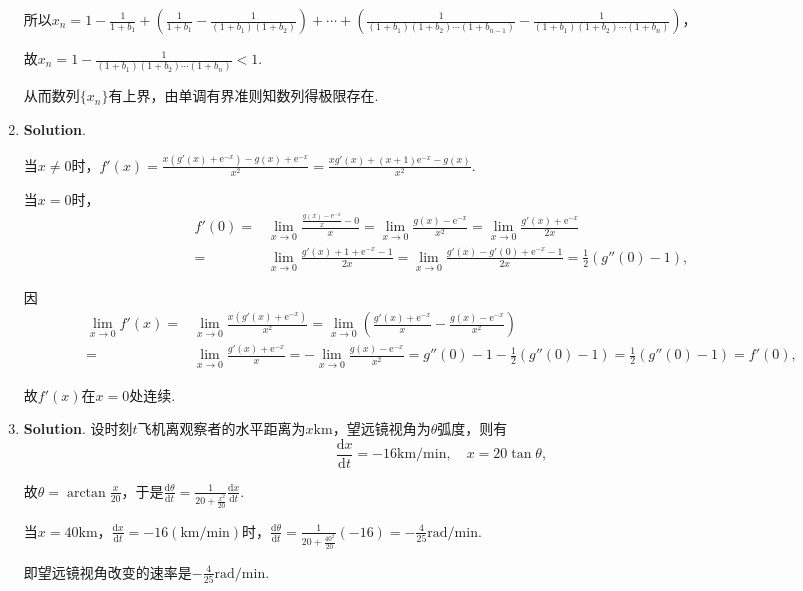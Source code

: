 \documentclass[../Main.tex]{subfiles}
\begin{document}
\begin{enumerate}
          所以$x_{n}=1-\frac{1}{1+b_{1}}+\left(\frac{1}{1+b_{1}}-\frac{1}{(1+b_{1})(1+b_{2})}
              \right)+\cdots+\left(\frac{1}{(1+b_{1})(1+b_{2})\cdots(1+b_{n-1})}-\frac{1}{(1+b_{1})(1+b_{2})\cdots(1+b_{n})}
              \right)$，

          故$x_{n}=1-\frac{1}{(1+b_{1})(1+b_{2})\cdots(1+b_{n})}<1$.

          从而数列$\{x_{n}\}$有上界，由单调有界准则知数列得极限存在.

    \item \textbf{Solution}.

          当$x\neq0$时，$f'(x)=\frac{x(g'(x)+\mathrm{e}^{-x})-g(x)+\mathrm{e}^{-x}}{x^{2}}
              =\frac{xg'(x)+(x+1)\mathrm{e}^{-x}-g(x)}{x^{2}}$.

          当$x=0$时，
          \[
              \begin{aligned}
                  f'(0)= & \lim_{x\to0}\frac{\frac{g(x)-\mathrm{e}^{-x}}{x}-0}{x}=\lim_{x\to0}\frac{g(x)-\mathrm{e}^{-x}}{x^2}=\lim_{x\to0}\frac{g'(x)+\mathrm{e}^{-x}}{2x} \\
                  =      & \lim_{x\to0}\frac{g'(x)+1+\mathrm{e}^{-x}-1}{2x}=\lim_{x\to0}\frac{g'(x)-g'(0)+\mathrm{e}^{-x}-1}{2x}=\frac{1}{2}(g''(0)-1),
              \end{aligned}
          \]

          因
          \[
              \begin{aligned}
                  \lim_{x\to 0}f'(x)= & \lim_{x\to0}\frac{x(g'(x)+\mathrm{e}^{-x})}{x^2}=\lim_{x\to0}\left(\frac{g'(x)+\mathrm{e}^{-x}}{x}-\frac{g(x)-\mathrm{e}^{-x}}{x^2}\right)            \\
                  =                   & \lim_{x\to0}\frac{g'(x)+\mathrm{e}^{-x}}{x}=-\lim_{x\to0}\frac{g(x)-\mathrm{e}^{-x}}{x^2}=g''(0)-1-\frac{1}{2}(g''(0)-1)=\frac{1}{2}(g''(0)-1)=f'(0),
              \end{aligned}
          \]

          故$f'(x)$在$x=0$处连续.

    \item \textbf{Solution}. 设时刻$t$飞机离观察者的水平距离为$x\mathrm{km}$，望远镜视角为$\theta$弧度，则有
          \[
              \frac{\mathrm{d}x}{\mathrm{d}t}=-16\mathrm{km/min},\quad x=20\tan\theta,
          \]

          故$\theta=\arctan\frac{x}{20}$，于是$\frac{\mathrm{d}\theta}{\mathrm{d}t}=\frac{1}{20+\frac{x^2}{20}}
              \frac{\mathrm{d}x}{\mathrm{d}t}$.

          当$x=40\mathrm{km}$，$\frac{\mathrm{d}x}{\mathrm{d}t}=-16(\mathrm{km/min})$时，$\frac{\mathrm{d}\theta}{\mathrm{d}t}
              =\frac{1}{20+\frac{40^2}{20}}(-16)=-\frac{4}{25}\mathrm{rad/min}$.

          即望远镜视角改变的速率是$-\frac{4}{25}\mathrm{rad/min}$.
\end{enumerate}
\end{document}
